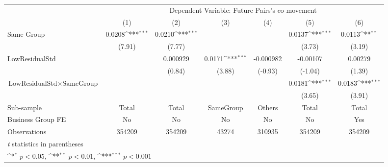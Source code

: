 {
\def\sym#1{\ifmmode^{#1}\else\(^{#1}\)\fi}
\begin{tabular}{l*{6}{c}}
\hline\hline
                &\multicolumn{6}{c}{Dependent Variable:  Future Pairs's co-movement}                                              \\\cmidrule(lr){2-7}
                &\multicolumn{1}{c}{(1)}         &\multicolumn{1}{c}{(2)}         &\multicolumn{1}{c}{(3)}         &\multicolumn{1}{c}{(4)}         &\multicolumn{1}{c}{(5)}         &\multicolumn{1}{c}{(6)}         \\
\hline
Same Group      &   0.0208\sym{***}&   0.0210\sym{***}&                  &                  &   0.0137\sym{***}&   0.0113\sym{**} \\
                &   (7.91)         &   (7.77)         &                  &                  &   (3.73)         &   (3.19)         \\
[1em]
LowResidualStd  &                  & 0.000929         &   0.0171\sym{***}&-0.000982         & -0.00107         &  0.00279         \\
                &                  &   (0.84)         &   (3.88)         &  (-0.93)         &  (-1.04)         &   (1.39)         \\
[1em]
$ {\text{LowResidualStd} } \times {\text{SameGroup} }  $ &                  &                  &                  &                  &   0.0181\sym{***}&   0.0183\sym{***}\\
                &                  &                  &                  &                  &   (3.65)         &   (3.91)         \\
\hline
Sub-sample      &    Total         &    Total         &SameGroup         &   Others         &    Total         &    Total         \\
Business Group FE&       No         &       No         &       No         &       No         &       No         &      Yes         \\
Observations    &   354209         &   354209         &    43274         &   310935         &   354209         &   354209         \\
\hline\hline
\multicolumn{7}{l}{\footnotesize \textit{t} statistics in parentheses}\\
\multicolumn{7}{l}{\footnotesize \sym{*} \(p<0.05\), \sym{**} \(p<0.01\), \sym{***} \(p<0.001\)}\\
\end{tabular}
}
